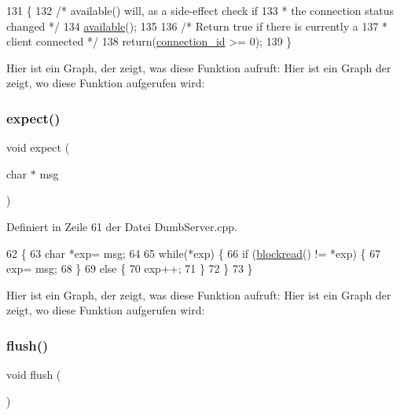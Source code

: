 \begin{DoxyCode}
131 \{
132   \textcolor{comment}{/* available() will, as a side-effect check if}
133 \textcolor{comment}{   * the connection status changed */}
134   \hyperlink{classEspServer_a4549a76725f2e4c013e4d57018366109}{available}();
135 
136   \textcolor{comment}{/* Return true if there is currently a}
137 \textcolor{comment}{   * client connected */}
138   \textcolor{keywordflow}{return}(\hyperlink{classEspServer_a821bd4e05f0b260cc584a2d23bda0fff}{connection\_id} >= 0);
139 \}
\end{DoxyCode}
Hier ist ein Graph, der zeigt, was diese Funktion aufruft\+:
Hier ist ein Graph der zeigt, wo diese Funktion aufgerufen wird\+:
\mbox{\label{classEspServer_aff5ea67ab96af075223b2b836036ccf1}} 
\subsubsection{\texorpdfstring{expect()}{expect()}}
{\footnotesize\ttfamily void expect (\begin{DoxyParamCaption}\item[{char $\ast$}]{msg }\end{DoxyParamCaption})\hspace{0.3cm}{\ttfamily [private]}}



Definiert in Zeile 61 der Datei Dumb\+Server.\+cpp.


\begin{DoxyCode}
62 \{
63   \textcolor{keywordtype}{char} *exp= msg;
64 
65   \textcolor{keywordflow}{while}(*exp) \{
66     \textcolor{keywordflow}{if} (\hyperlink{classEspServer_ac2b4ae3c7ebcd751c4c8020412fa3270}{blockread}() != *exp) \{
67       exp= msg;
68     \}
69     \textcolor{keywordflow}{else} \{
70       exp++;
71     \}
72   \}
73 \}
\end{DoxyCode}
Hier ist ein Graph, der zeigt, was diese Funktion aufruft\+:
Hier ist ein Graph der zeigt, wo diese Funktion aufgerufen wird\+:
\mbox{\label{classEspServer_adac116554b543b7c4228c018a85882f5}} 
\subsubsection{\texorpdfstring{flush()}{flush()}}
{\footnotesize\ttfamily void flush (\begin{DoxyParamCaption}{ }\end{DoxyParamCaption})\hspace{0.3cm}{\ttfamily [virtual]}}




